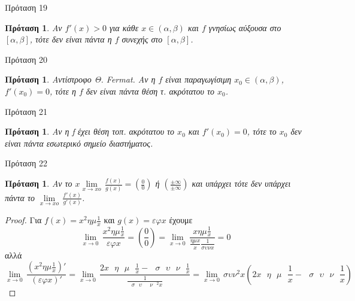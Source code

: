 \documentclass[greek]{beamer}
\newtheorem{proposition}[theorem]{Πρόταση}
\begin{document}
\begin{frame}{Πρόταση 19}
 \begin{proposition}
  \normalfont Αν $f'\left( x  \right)>0$ για κάθε $x\in \left( \alpha ,\beta  \right)$ και $f$ γνησίως αύξουσα στο $\left[ \alpha ,\beta  \right]$, τότε δεν είναι πάντα η $f$ συνεχής στο $\left[ \alpha ,\beta  \right]$.
 \end{proposition}
\end{frame}

\begin{frame}{Πρόταση 20}
 \begin{proposition}
  \normalfont Αντίστροφο Θ. Fermat. Αν η $f$ είναι παραγωγίσιμη ${{x}_{0}}\in \left( \alpha ,\beta  \right)$, $f'\left( {{x}_{0}} \right)=0$, τότε η $f$ δεν είναι πάντα θέση τ. ακρότατου το ${{x}_{0}}$.
 \end{proposition}
\end{frame}

\begin{frame}{Πρόταση 21}
 \begin{proposition}
  \normalfont Αν η f έχει θέση τοπ. ακρότατου το ${{x}_{0}}$ και $f'\left( {{x}_{0}} \right)=0$, τότε το ${{x}_{0}}$ δεν είναι πάντα εσωτερικό σημείο διαστήματος.
 \end{proposition}
\end{frame}

\begin{frame}{Πρόταση 22}
 \begin{proposition}
  \normalfont Αν το $x\underset{x\to xo}{\mathop{\lim }}\,\frac{f\left( x \right)}{g\left( x \right)}=\left( \frac{0}{0} \right)$ ή $\left( \frac{\pm \infty }{\pm \infty } \right)$ και υπάρχει τότε δεν υπάρχει πάντα το $\underset{x\to xo}{\mathop{\lim }}\,\frac{f'\left( x \right)}{g'\left( x \right)}$.
 \end{proposition}
 \begin{proof}
  Για $f\left( x \right)={{x}^{2}}\eta \mu \frac{1}{x}$ και $g\left( x \right)=\varepsilon \varphi x$ έχουμε $$\underset{x\to 0}{\mathop{\lim }}\,\frac{{{x}^{2}}\eta \mu \frac{1}{x}}{\varepsilon \varphi x}=\left( \frac{0}{0} \right)=\underset{x\to 0}{\mathop{\lim }}\,\frac{x\eta \mu \frac{1}{x}}{\frac{\eta \mu x}{x}\frac{1}{\sigma \upsilon \nu x}}=0$$
    αλλά
  $$\underset{x\to 0}{\mathop{\lim }}\,\frac{\left( {{x}^{2}}\eta \mu \frac{1}{x} \right)'}{\left( \varepsilon \varphi x \right)'}=\underset{x\to 0}{\mathop{\lim }}\,\frac{2x\text{ }\!\!\eta\!\!\text{  }\!\!\mu\!\!\text{ }\frac{1}{x}-\text{ }\!\!\sigma\!\!\text{  }\!\!\upsilon\!\!\text{  }\!\!\nu\!\!\text{ }\frac{1}{x}}{\frac{1}{\text{ }\!\!\sigma\!\!\text{  }\!\!\upsilon\!\!\text{ }{{\text{ }\!\!\nu\!\!\text{ }}^{2}}x}}=\underset{x\to 0}{\mathop{\lim }}\,\sigma \upsilon {{\nu }^{2}}x\left( 2x\text{ }\!\!\eta\!\!\text{  }\!\!\mu\!\!\text{ }\frac{1}{x}-\text{ }\!\!\sigma\!\!\text{  }\!\!\upsilon\!\!\text{  }\!\!\nu\!\!\text{ }\frac{1}{x} \right)$$
 \end{proof}
\end{frame}
\end{document}
